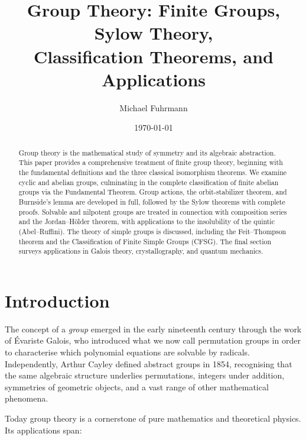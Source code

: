 \documentclass[12pt,a4paper]{amsart}
\title{Group Theory: Finite Groups, Sylow Theory,\\
       Classification Theorems, and Applications}
\author{Michael Fuhrmann}
\date{\today}
\theoremstyle{definition}
\begin{document}
\begin{abstract}
Group theory is the mathematical study of symmetry and its algebraic abstraction.
This paper provides a comprehensive treatment of finite group theory, beginning with
the fundamental definitions and the three classical isomorphism theorems. We examine
cyclic and abelian groups, culminating in the complete classification of finite abelian
groups via the Fundamental Theorem. Group actions, the orbit-stabilizer theorem, and
Burnside's lemma are developed in full, followed by the Sylow theorems with complete
proofs. Solvable and nilpotent groups are treated in connection with composition series
and the Jordan--H\"{o}lder theorem, with applications to the insolubility of the quintic
(Abel--Ruffini). The theory of simple groups is discussed, including the Feit--Thompson
theorem and the Classification of Finite Simple Groups (CFSG). The final section surveys
applications in Galois theory, crystallography, and quantum mechanics.
\end{abstract}

\maketitle
\tableofcontents

\section{Introduction}
\label{sec:introduction}

The concept of a \emph{group} emerged in the early nineteenth century through the work
of \'{E}variste Galois, who introduced what we now call permutation groups in order to
characterise which polynomial equations are solvable by radicals. Independently,
Arthur Cayley defined abstract groups in 1854, recognising that the same algebraic
structure underlies permutations, integers under addition, symmetries of geometric
objects, and a vast range of other mathematical phenomena.

Today group theory is a cornerstone of pure mathematics and theoretical physics.
Its applications span:
\end{document}
